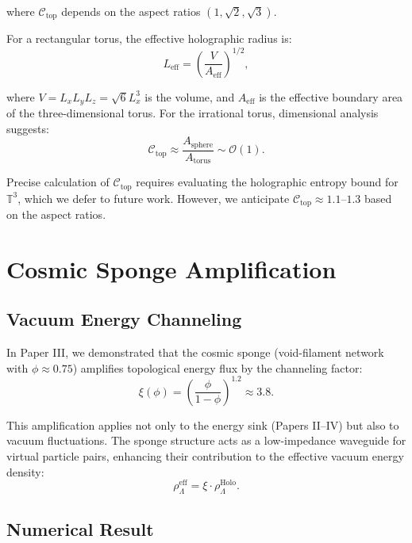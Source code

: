 \documentclass[12pt,a4paper]{article}
\begin{document}
where $\mathcal{C}_{\mathrm{top}}$ depends on the aspect ratios $(1, \sqrt{2}, \sqrt{3})$.

For a rectangular torus, the effective holographic radius is:
\begin{equation}
L_{\mathrm{eff}} = \left(\frac{V}{A_{\mathrm{eff}}}\right)^{1/2},
\end{equation}

where $V = L_x L_y L_z = \sqrt{6} L_x^3$ is the volume, and $A_{\mathrm{eff}}$ is the effective boundary area of the three-dimensional torus. For the irrational torus, dimensional analysis suggests:
\begin{equation}
\mathcal{C}_{\mathrm{top}} \approx \frac{A_{\mathrm{sphere}}}{A_{\mathrm{torus}}} \sim \mathcal{O}(1).
\end{equation}

Precise calculation of $\mathcal{C}_{\mathrm{top}}$ requires evaluating the holographic entropy bound for $\mathbb{T}^3$, which we defer to future work. However, we anticipate $\mathcal{C}_{\mathrm{top}} \approx 1.1\text{--}1.3$ based on the aspect ratios.

\section{Cosmic Sponge Amplification}

\subsection{Vacuum Energy Channeling}

In Paper III, we demonstrated that the cosmic sponge (void-filament network with $\phi \approx 0.75$) amplifies topological energy flux by the channeling factor:
\begin{equation}
\xi(\phi) = \left(\frac{\phi}{1-\phi}\right)^{1.2} \approx 3.8.
\end{equation}

This amplification applies not only to the energy sink (Papers II--IV) but also to vacuum fluctuations. The sponge structure acts as a low-impedance waveguide for virtual particle pairs, enhancing their contribution to the effective vacuum energy density:
\begin{equation}
\rho_{\Lambda}^{\mathrm{eff}} = \xi \cdot \rho_{\Lambda}^{\mathrm{Holo}}.
\end{equation}

\subsection{Numerical Result}
\end{document}
